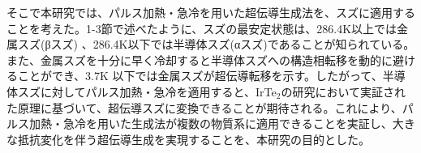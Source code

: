 そこで本研究では、パルス加熱・急冷を用いた超伝導生成法を、スズに適用することを考えた。1-3節で述べたように、スズの最安定状態は、286.4K以上では金属スズ(βスズ) 、286.4K以下では半導体スズ(αスズ)であることが知られている。また、金属スズを十分に早く冷却すると半導体スズへの構造相転移を動的に避けることができ、3.7K 以下では金属スズが超伝導転移を示す。したがって、半導体スズに対してパルス加熱・急冷を適用すると、IrTe$_2$の研究において実証された原理に基づいて、超伝導スズに変換できることが期待される。これにより、パルス加熱・急冷を用いた生成法が複数の物質系に適用できることを実証し、大きな抵抗変化を伴う超伝導生成を実現することを、本研究の目的とした。
\clearpage
